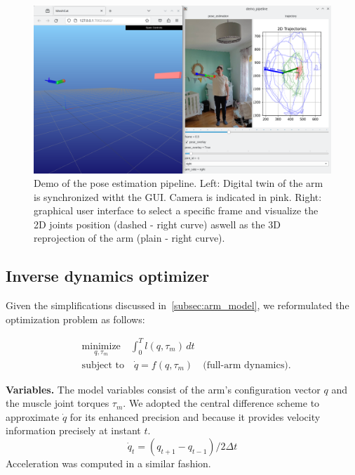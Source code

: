 \begin{figure}
    \centering
    \includegraphics[width=16cm]{figures/arm_demo.png}
    \caption{Demo of the pose estimation pipeline.
    Left: Digital twin of the arm is synchronized witht the GUI. Camera is indicated in pink.
    Right: graphical user interface to select a specific frame
    and visualize the 2D joints position (dashed - right curve) aswell as the 3D reprojection of the arm (plain - right curve).}
    \label{fig:demo}
\end{figure}

\subsection{Inverse dynamics optimizer}
\label{subsec:inverse_dynamics}

Given the simplifications discussed in~\cref{subsec:arm_model}, we reformulated the optimization problem as follows:

\begin{equation*}
    \begin{aligned}
        & \underset{q,\tau_m}{\text{minimize}} \quad \int_{0}^{T} l(q, \tau_m)\, dt \\
        & \text{subject to} \quad \dot{q} = f(q, \tau_m) \quad \text{(full-arm dynamics)}.
    \end{aligned}
\end{equation*}

\noindent\textbf{Variables.} The model variables consist of the arm's configuration vector \(q\) and the muscle joint torques \(\tau_m\). 
We adopted the central difference scheme to approximate \(\dot{q}\) for its enhanced precision and because it provides velocity information precisely 
at instant \(t\).
\[
    \dot{q}_t = (q_{t + 1} - q_{t - 1}) / 2\Delta t
\]
Acceleration was computed in a similar fashion.

